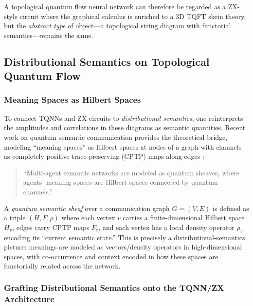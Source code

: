 \documentclass[
]{article}
\numberwithin{equation}{section}
\begin{document}
A topological quantum flow neural network can therefore be regarded as a
ZX-style circuit where the graphical calculus is enriched to a 3D TQFT
skein theory, but the \emph{abstract type} of object---a topological
string diagram with functorial semantics---remains the same.

\subsection{Distributional Semantics on Topological Quantum
Flow}\label{distributional-semantics-on-topological-quantum-flow}

\subsubsection{Meaning Spaces as Hilbert
Spaces}\label{meaning-spaces-as-hilbert-spaces}

To connect TQNNs and ZX circuits to \emph{distributional semantics}, one
reinterprets the amplitudes and correlations in these diagrams as
semantic quantities. Recent work on quantum semantic communication
provides the theoretical bridge, modeling ``meaning spaces'' as Hilbert
spaces at nodes of a graph with channels as completely positive
trace-preserving (CPTP) maps along edges \citep{khatri2025quantum}:

\begin{quote}
``Multi-agent semantic networks are modeled as quantum sheaves, where
agents' meaning spaces are Hilbert spaces connected by quantum
channels.'' \citep{khatri2025quantum}
\end{quote}

A \emph{quantum semantic sheaf} over a communication graph \(G=(V,E)\)
is defined as a triple \((H,F,\rho)\) where each vertex \(v\) carries a
finite-dimensional Hilbert space \(H_v\), edges carry CPTP maps \(F_e\),
and each vertex has a local density operator \(\rho_v\) encoding its
``current semantic state.'' This is precisely a distributional-semantics
picture: meanings are modeled as vectors/density operators in
high-dimensional spaces, with co-occurrence and context encoded in how
these spaces are functorially related across the network.

\subsubsection{Grafting Distributional Semantics onto the TQNN/ZX
Architecture}\label{grafting-distributional-semantics-onto-the-tqnnzx-architecture}
\end{document}
